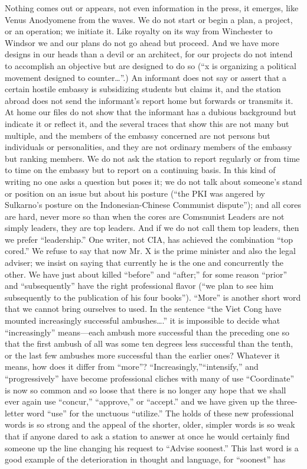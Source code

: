 \documentclass[
    oneside,
    11pt,
    draft
]{memoir}
\begin{document}
Nothing comes out or appears, not even information in the press, it emerges, like Venus Anodyomene from the waves. We do not start or begin a plan, a project, or an operation; we initiate it. Like royalty on its way from Winchester to Windsor we and our plans do not go ahead but proceed. And we have more designs in our heads than a devil or an architect, for our projects do not intend to accomplish an objective but are designed to do so (\enquote{x is organizing a political movement designed to counter\dots}.) An informant does not say or assert that a certain hostile embassy is subsidizing students but claims it, and the station abroad does not send the informant's report home but forwards or transmits it. At home our files do not show that the informant has a dubious background but indicate it or reflect it, and the several traces that show this are not many but multiple, and the members of the embassy concerned are not persons but individuals or personalities, and they are not ordinary members of the embassy but ranking members. We do not ask the station to report regularly or from time to time on the embassy but to report on a continuing basis. In this kind of writing no one asks a question but poses it; we do not talk about someone's stand or position on an issue but about his posture (\enquote{the PKI was angered by Sulkarno's posture on the Indonesian-Chinese Communist dispute}); and all cores are hard, never more so than when the cores are Comsnunist Leaders are not simply leaders, they are top leaders. And if we do not call them top leaders, then we prefer \enquote{leadership.} One writer, not CIA, has achieved the combination \enquote{top cored.} We refuse to say that now Mr. X is the prime minister and also the legal adviser; we insist on saying that currently he is the one and concurrently the other. We have just about killed \enquote{before} and \enquote{after;} for some reason \enquote{prior} and \enquote{subsequently} have the right professional flavor (\enquote{we plan to see him subsequently to the publication of his four books}). \enquote{More} is another short word that we cannot bring ourselves to used. In the sentence \enquote{the Viet Cong have mounted increasingly successful ambushes\dots.} it is impossible to decide what \enquote{increasingly} means---each ambush more successful than the preceding one so that the first ambush of all was some ten degrees less successful than the tenth, or the last few ambushes more successful than the earlier ones? Whatever it means, how does it differ from \enquote{more}? \enquote{Increasingly,}\enquote{intensify,} and \enquote{progressively} have become professional cliches with many of use \enquote{Coordinate} is now so common and so loose that there is no longer any hope that we shall ever again use \enquote{concur,} \enquote{approve,} or \enquote{accept.} and we have given up the three-letter word \enquote{use} for the unctuous \enquote{utilize.} The holds of these new professional words is so strong and the appeal of the shorter, older, simpler words is so weak that if anyone dared to ask a station to answer at once he would certainly find someone up the line changing his request to \enquote{Advise soonest.} This last word is a good example of the deterioration in thought and language, for \enquote{soonest} has 
\end{document}
